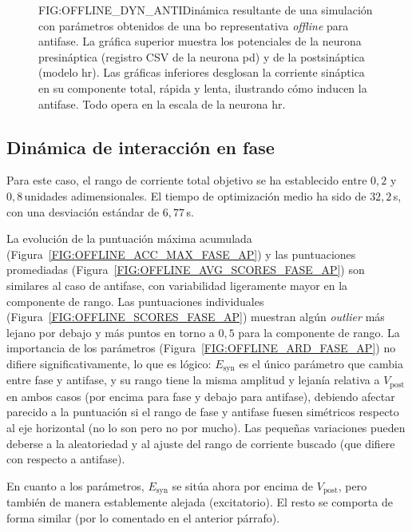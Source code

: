 \begin{figure}[Potenciales de membrana y corriente sináptica en la dinámica resultante de la \acl{bo} \textit{offline} en antifase]{FIG:OFFLINE_DYN_ANTI}{Dinámica resultante de una simulación con parámetros obtenidos de una \ac{bo} representativa \textit{offline} para antifase. La gráfica superior muestra los potenciales de la neurona presináptica (registro CSV de la neurona \ac{pd}) y de la postsináptica (modelo \ac{hr}). Las gráficas inferiores desglosan la corriente sináptica en su componente total, rápida y lenta, ilustrando cómo inducen la antifase. Todo opera en la escala de la neurona \ac{hr}.}
\end{figure}


\subsection{Dinámica de interacción en fase\label{SUBSEC:OFFLINE_FASE}}

Para este caso, el rango de corriente total objetivo se ha establecido entre $0{,}2$ y $0{,}8$\,unidades adimensionales. El tiempo de optimización medio ha sido de $32{,}2$\,s, con una desviación estándar de $6{,}77$\,s.

La evolución de la puntuación máxima acumulada (Figura~\ref{FIG:OFFLINE_ACC_MAX_FASE_AP}) y las puntuaciones promediadas (Figura~\ref{FIG:OFFLINE_AVG_SCORES_FASE_AP}) son similares al caso de antifase, con variabilidad ligeramente mayor en la componente de rango. Las puntuaciones individuales (Figura~\ref{FIG:OFFLINE_SCORES_FASE_AP}) muestran algún \textit{outlier} más lejano por debajo y más puntos en torno a $0{,}5$ para la componente de rango. La importancia de los parámetros (Figura~\ref{FIG:OFFLINE_ARD_FASE_AP}) no difiere significativamente, lo que es lógico: $E_{\mathrm{syn}}$ es el único parámetro que cambia entre fase y antifase, y su rango tiene la misma amplitud y lejanía relativa a $V_{\mathrm{post}}$ en ambos casos (por encima para fase y debajo para antifase), debiendo afectar parecido a la puntuación si el rango de fase y antifase fuesen simétricos respecto al eje horizontal (no lo son pero no por mucho). Las pequeñas variaciones pueden deberse a la aleatoriedad y al ajuste del rango de corriente buscado (que difiere con respecto a antifase).

En cuanto a los parámetros, $E_{\mathrm{syn}}$ se sitúa ahora por encima de $V_{\mathrm{post}}$, pero también de manera establemente alejada (excitatorio). El resto se comporta de forma similar (por lo comentado en el anterior párrafo).

